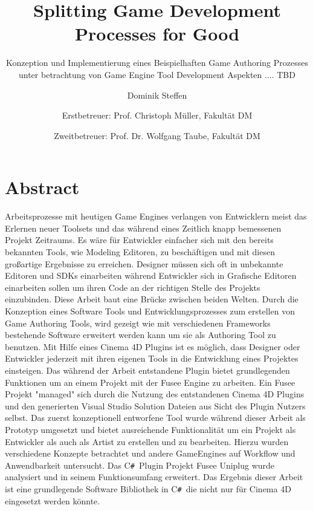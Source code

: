 \documentclass[pagesize, paper=a4, fontsize=12pt, titlepage=true, headings=small, headnosepline, abstractoff, liststotoc, nochapterprefix, plainheadsepline, twoside]{scrreprt}
\author{
Dominik Steffen \and
Erstbetreuer: Prof. Christoph Müller, Fakultät DM \and
Zweitbetreuer: Prof. Dr. Wolfgang Taube, Fakultät DM
}
\title{Splitting Game Development Processes for Good}
\subtitle{Konzeption und Implementierung eines Beispielhaften Game Authoring Prozesses unter betrachtung von Game Engine Tool Development Aspekten .... TBD}
\newcommand{\CSS}{C\texttt{\# }}
\begin{document}



\newpage
\thispagestyle{empty}
\mbox{}

\begingroup
\newpage
\pagestyle{empty}
\renewcommand*{\chapterpagestyle}{empty}
\chapter*{Abstract}%
Arbeitsprozesse mit heutigen Game Engines verlangen von Entwicklern meist das Erlernen neuer Toolsets und das während eines Zeitlich knapp bemessenen Projekt Zeitraums. Es wäre für Entwickler einfacher sich mit den bereits bekannten Tools, wie Modeling Editoren, zu beschäftigen und mit diesen großartige Ergebnisse zu erreichen. Designer müssen sich oft in unbekannte Editoren und SDKs einarbeiten während Entwickler sich in Grafische Editoren einarbeiten sollen um ihren Code an der richtigen Stelle des Projekts einzubinden.
Diese Arbeit baut eine Brücke zwischen beiden Welten. Durch die Konzeption eines Software Tools und Entwicklungsprozesses zum erstellen von Game Authoring Tools, wird gezeigt wie mit verschiedenen Frameworks bestehende Software erweitert werden kann um sie als Authoring Tool zu benutzen. Mit Hilfe eines Cinema 4D Plugins ist es möglich, dass Designer oder Entwickler jederzeit mit ihren eigenen Tools in die Entwicklung eines Projektes einsteigen. Das während der Arbeit entstandene Plugin bietet grundlegenden Funktionen um an einem Projekt mit der Fusee Engine zu arbeiten. Ein Fusee Projekt "managed" sich durch die Nutzung des entstandenen Cinema 4D Plugins und den generierten Visual Studio Solution Dateien aus Sicht des Plugin Nutzers selbst.
Das zuerst konzeptionell entworfene Tool wurde während dieser Arbeit als Prototyp umgesetzt und bietet ausreichende Funktionalität um ein Projekt als Entwickler als auch als Artist zu erstellen und zu bearbeiten. Hierzu wurden verschiedene Konzepte betrachtet und andere GameEngines auf Workflow und Anwendbarkeit untersucht. Das \CSS Plugin Projekt Fusee Uniplug wurde analysiert und in seinem Funktionsumfang erweitert. Das Ergebnis dieser Arbeit ist eine grundlegende Software Bibliothek in \CSS die nicht nur für Cinema 4D eingesetzt werden könnte.
\end{document}
